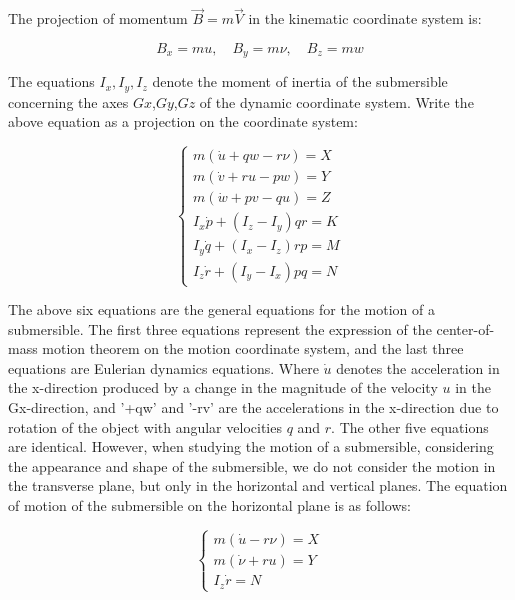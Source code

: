 \documentclass[12pt]{article}
\begin{document}
The projection of momentum $\vec{B}=m\vec{V}$ in the kinematic coordinate system is:

\begin{equation}
    B_{x}=mu,\quad B_{y}=m\nu,\quad B_{z}=mw
\end{equation}

The equations $I_{x}, I_{y}, I_{z}$ denote the moment of inertia of the submersible concerning the axes $Gx$,$Gy$,$Gz$ of the dynamic coordinate system.
Write the above equation as a projection on the coordinate system:

\begin{equation}
    \left\{
    \begin{aligned}
        m(\dot{u}+qw-r\nu) = X   \\
        m(\dot{v}+ru-pw)=Y       \\
        m(\dot{w}+pv-qu)=Z       \\
        I_x\dot{p}+(I_z-I_y)qr=K \\
        I_y\dot{q}+(I_x-I_z)rp=M \\
        I_z\dot{r}+(I_y-I_x)pq=N
    \end{aligned}
    \right.
\end{equation}

The above six equations are the general equations for the motion of a submersible. The first three equations represent the expression of the center-of-mass motion theorem on the motion coordinate system, and the last three equations are Eulerian dynamics equations. Where $\dot{u}$ denotes the acceleration in the x-direction produced by a change in the magnitude of the velocity $u$ in the Gx-direction, and '+qw' and '-rv' are the accelerations in the x-direction due to rotation of the object with angular velocities $q$ and $r$. The other five equations are identical.
However, when studying the motion of a submersible, considering the appearance and shape of the submersible, we do not consider the motion in the transverse plane, but only in the horizontal and vertical planes. The equation of motion of the submersible on the horizontal plane is as follows:

\begin{equation}
    \left\{
    \begin{aligned}
        m(\dot{u}-r\nu) = X \\
        m(\dot{\nu}+ru)=Y   \\
        I_z\dot{r}=N
    \end{aligned}
    \right.
\end{equation}
\end{document}
